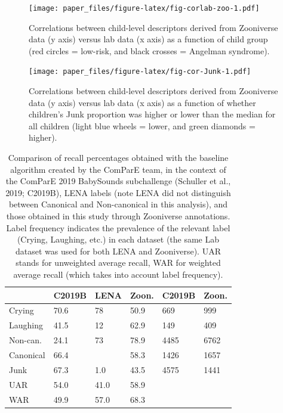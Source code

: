 \documentclass[
  english,
  ,man]{apa6}
\begin{document}
\begin{figure}
\centering
\texttt{[image: paper\_files/figure-latex/fig-corlab-zoo-1.pdf]}
\caption{\label{fig:fig-corlab-zoo}Correlations between child-level descriptors derived from Zooniverse data (y axis) versus lab data (x axis) as a function of child group (red circles = low-risk, and black crosses = Angelman syndrome).}
\end{figure}

\begin{figure}
\centering
\texttt{[image: paper\_files/figure-latex/fig-cor-Junk-1.pdf]}
\caption{\label{fig:fig-cor-Junk}Correlations between child-level descriptors derived from Zooniverse data (y axis) versus lab data (x axis) as a function of whether children's Junk proportion was higher or lower than the median for all children (light blue wheels = lower, and green diamonds = higher).}
\end{figure}

\begin{table}

\caption{\label{tab:tab-LENA-challenge}Comparison of recall percentages obtained with the baseline algorithm created by the ComParE team, in the context of the ComParE 2019 BabySounds subchallenge (Schuller et al., 2019; C2019B), LENA labels (note LENA did not distinguish between Canonical and Non-canonical in this analysis), and those obtained in this study through Zooniverse annotations. Label frequency indicates the prevalence of the relevant label (Crying, Laughing, etc.) in each dataset (the same Lab dataset was used for both LENA and Zooniverse). UAR stands for unweighted average recall, WAR for weighted average recall (which takes into account label frequency).}
\centering
\begin{tabular}[t]{l|l|l|l|l|l}
\hline
 & C2019B & LENA & Zoon. & C2019B & Zoon.\\
\hline
Crying & 70.6 & 78 & 50.9 & 669 & 999\\
\hline
Laughing & 41.5 & 12 & 62.9 & 149 & 409\\
\hline
Non-can. & 24.1 & 73 & 78.9 & 4485 & 6762\\
\hline
Canonical & 66.4 &  & 58.3 & 1426 & 1657\\
\hline
Junk & 67.3 & 1.0 & 43.5 & 4575 & 1441\\
\hline
UAR & 54.0 & 41.0 & 58.9 &  & \\
\hline
WAR & 49.9 & 57.0 & 68.3 &  & \\
\hline
\end{tabular}
\end{table}
\end{document}
